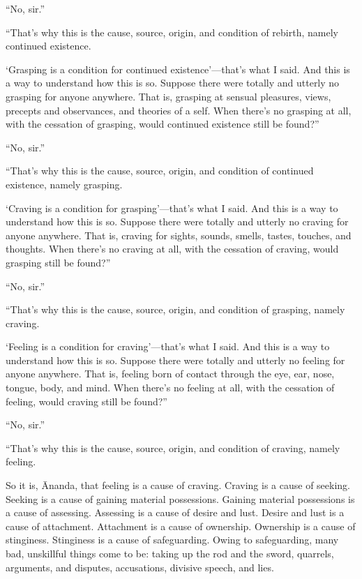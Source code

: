 \documentclass[12pt,openany]{book}%
\begin{document}
“No, sir.” 

“That’s why this is the cause, source, origin, and condition of rebirth, namely continued existence. 

‘Grasping is a condition for continued existence’—that’s what I said. And this is a way to understand how this is so. Suppose there were totally and utterly no grasping for anyone anywhere. That is, grasping at sensual pleasures, views, precepts and observances, and theories of a self. When there’s no grasping at all, with the cessation of grasping, would continued existence still be found?” 

“No, sir.” 

“That’s why this is the cause, source, origin, and condition of continued existence, namely grasping. 

‘Craving is a condition for grasping’—that’s what I said. And this is a way to understand how this is so. Suppose there were totally and utterly no craving for anyone anywhere. That is, craving for sights, sounds, smells, tastes, touches, and thoughts. When there’s no craving at all, with the cessation of craving, would grasping still be found?” 

“No, sir.” 

“That’s why this is the cause, source, origin, and condition of grasping, namely craving. 

‘Feeling is a condition for craving’—that’s what I said. And this is a way to understand how this is so. Suppose there were totally and utterly no feeling for anyone anywhere. That is, feeling born of contact through the eye, ear, nose, tongue, body, and mind. When there’s no feeling at all, with the cessation of feeling, would craving still be found?” 

“No, sir.” 

“That’s why this is the cause, source, origin, and condition of craving, namely feeling. 

So it is, Ānanda, that feeling is a cause of craving. Craving is a cause of seeking. Seeking is a cause of gaining material possessions. Gaining material possessions is a cause of assessing. Assessing is a cause of desire and lust. Desire and lust is a cause of attachment. Attachment is a cause of ownership. Ownership is a cause of stinginess. Stinginess is a cause of safeguarding. Owing to safeguarding, many bad, unskillful things come to be: taking up the rod and the sword, quarrels, arguments, and disputes, accusations, divisive speech, and lies. 
\end{document}
